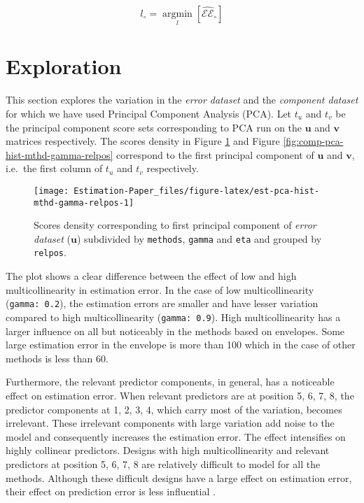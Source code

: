 \documentclass[12pt,3p,authoryear]{elsarticle}
\begin{document}
\begin{equation}
  l_{\circ} = \operatorname*{argmin}_{l}\left[\widehat{\mathcal{EE}}_{\circ}\right]
  \label{eq:min-comp}
\end{equation}

\hypertarget{exploration}{%
\section{Exploration}\label{exploration}}

This section explores the variation in the \emph{error dataset} and the \emph{component dataset} for which we have used Principal Component Analysis (PCA). Let \(t_u\) and \(t_v\) be the principal component score sets corresponding to PCA run on the \(\mathbf{u}\) and \(\mathbf{v}\) matrices respectively. The scores density in Figure \ref{fig:est-pca-hist-mthd-gamma-relpos} and Figure \ref{fig:comp-pca-hist-mthd-gamma-relpos} correspond to the first principal component of \(\mathbf{u}\) and \(\mathbf{v}\), i.e.~the first column of \(t_u\) and \(t_v\) respectively.



\begin{figure}[!htb]
\texttt{[image: Estimation-Paper\_files/figure-latex/est-pca-hist-mthd-gamma-relpos-1]} \caption{Scores density corresponding to first principal component of \emph{error dataset} (\(\mathbf{u}\)) subdivided by \texttt{methods}, \texttt{gamma} and \texttt{eta} and grouped by \texttt{relpos}.}\label{fig:est-pca-hist-mthd-gamma-relpos}
\end{figure}

The plot shows a clear difference between the effect of low and high multicollinearity in estimation error. In the case of low multicollinearity (\texttt{gamma:\ 0.2}), the estimation errors are smaller and have lesser variation compared to high multicollinearity (\texttt{gamma:\ 0.9}). High multicollinearity has a larger influence on all but noticeably in the methods based on envelopes. Some large estimation error in the envelope is more than 100 which in the case of other methods is less than 60.

Furthermore, the relevant predictor components, in general, has a noticeable effect on estimation error. When relevant predictors are at position 5, 6, 7, 8, the predictor components at 1, 2, 3, 4, which carry most of the variation, becomes irrelevant. These irrelevant components with large variation add noise to the model and consequently increases the estimation error. The effect intensifies on highly collinear predictors. Designs with high multicollinearity and relevant predictors at position 5, 6, 7, 8 are relatively difficult to model for all the methods. Although these difficult designs have a large effect on estimation error, their effect on prediction error is less influential \citep{rimal2019pred}.
\end{document}
